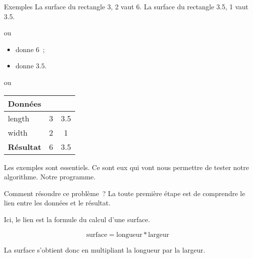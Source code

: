 \begin{frame}{Exemples}
  La surface du rectangle 3, 2 vaut 6. La surface du rectangle 3.5,
  1 vaut 3.5. 

  \pause ou 

  \begin{itemize}
  \item {} donne \(6\)~;
  \item {} donne \(3.5\).
  \end{itemize}

  \pause ou

  \begin{center}
    \begin{tabular}[t]{|l|c|c|}
      \hline
      \cellcolor{black!40}\textbf{Données}&&\\
      \hline
      length  &  3  & 3.5\\
      width  &   2  & 1\\
      \hline
      \cellcolor{black!40}\textbf{Résultat}& 6 & 3.5\\
      \hline
    \end{tabular}
  \end{center}

  \pause
  Les exemples sont essentiels. Ce sont eux qui vont nous permettre de
  tester notre algorithme. Notre programme. 
\end{frame}

\begin{frame}{Comment résoudre ce problème~?}
  La toute première étape est de comprendre
  le lien entre les données et le résultat.

  \pause
  Ici, le lien est la formule du calcul d'une surface.

  \[
    \textrm{surface} = \textrm{longueur} * \textrm{largeur}
  \]

  La surface s’obtient donc en multipliant la longueur par la largeur.

\end{frame}

